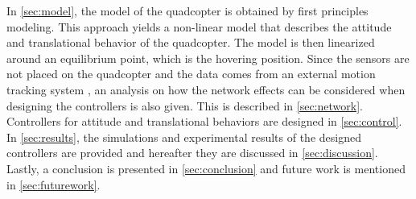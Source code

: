 In \autoref{sec:model}, the model of the quadcopter is obtained by first principles modeling. This approach yields a non-linear model that describes the attitude and translational behavior of the quadcopter. The model is then linearized around an equilibrium point, which is the hovering position. 
%
Since the sensors are not placed on the quadcopter and the data comes from an external motion tracking system \cite{vicon}, an analysis on how the network effects can be considered when designing the controllers is also given. This is described in \autoref{sec:network}.
%
Controllers for attitude and translational behaviors are designed in \autoref{sec:control}.%
%
In \autoref{sec:results}, the simulations and experimental results of the designed controllers are provided and hereafter they are discussed in \autoref{sec:discussion}. Lastly, a conclusion is presented in \autoref{sec:conclusion} and future work is mentioned in \autoref{sec:futurework}. 